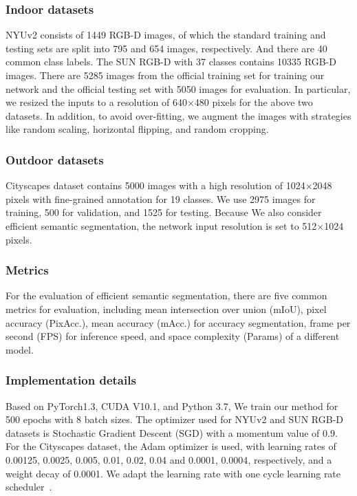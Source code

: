 \documentclass[journal,twoside,web]{ieeecolor}
\begin{document}
\subsubsection{Indoor datasets}
NYUv2 consists of 1449 RGB-D images, of which the standard training and testing sets are split into 795 and 654 images, respectively. And there are 40 common class labels. The SUN RGB-D with 37 classes contains 10335 RGB-D images. There are 5285 images from the official training set for training our network and the official testing set with 5050 images for evaluation. In particular, we resized the inputs to a resolution of 640×480 pixels for the above two datasets. In addition, to avoid over-fitting, we augment the images with strategies like random scaling, horizontal flipping, and random cropping. 

\subsubsection{Outdoor datasets}
Cityscapes dataset contains 5000 images with a high resolution of 1024$\times$2048 pixels with fine-grained annotation for 19 classes. We use 2975 images for training, 500 for validation, and 1525 for testing. Because We also consider efficient semantic segmentation, the network input resolution is set to 512$\times$1024 pixels.

\subsubsection{Metrics}
For the evaluation of efficient semantic segmentation, there are five common metrics for evaluation, including mean intersection over union (mIoU), pixel accuracy (PixAcc.), mean accuracy (mAcc.) for accuracy segmentation, frame per second (FPS) for inference speed, and space complexity (Params) of a different model.

\subsubsection{Implementation details}
Based on PyTorch1.3, CUDA V10.1, and Python 3.7, We train our method for 500 epochs with 8 batch sizes. The optimizer used for NYUv2 and SUN RGB-D datasets is Stochastic Gradient Descent (SGD) with a momentum value of 0.9. For the Cityscapes dataset, the Adam optimizer is used, with learning rates of {0.00125, 0.0025, 0.005, 0.01, 0.02, 0.04} and {0.0001, 0.0004}, respectively, and a weight decay of 0.0001.  We adapt the learning rate with one cycle learning rate scheduler~\cite{EMSANet}. 
\end{document}
